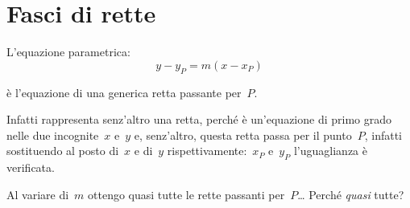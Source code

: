 \section{Fasci di rette}
\label{sec:retta_fasci}

L'equazione parametrica: \quad \[y - y_P = m (x - x_P)\] 

è l'equazione di una generica retta passante per~\(P\).

Infatti rappresenta senz'altro una retta, perché 
è un'equazione di primo grado nelle due incognite~\(x\) e~\(y\) e, 
senz'altro, questa retta passa per il punto~\(P\), 
infatti sostituendo al posto di~\(x\) e di~\(y\)  
rispettivamente:~\(x_P\) e~\(y_P\) l'uguaglianza è verificata.


Al variare di~\(m\) ottengo quasi tutte le rette passanti 
per~\(P\)\dots 
Perché \emph{quasi} tutte?
% 

